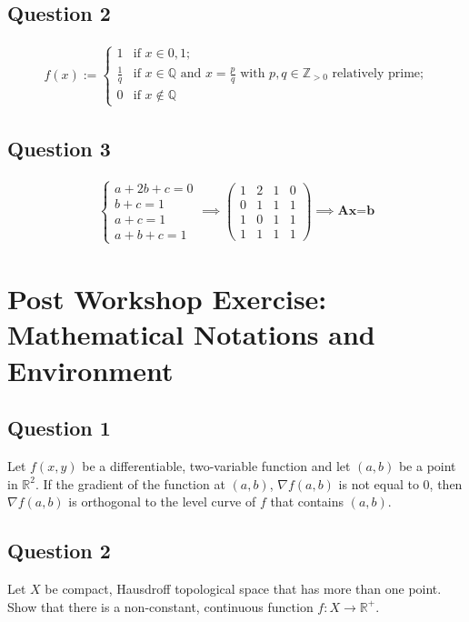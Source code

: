 \documentclass[12pt]{article}
\begin{document}
\subsection{Question 2}
\begin{align*}
    f(x):=
    \left\{
    \begin{array}{ll}
        1 & \text{if } x\in {0,1};\\
        \frac{1}{q} & \text{if } x\in\mathbb{Q} \text{ and } x=\frac{p}{q} \text{ with } p,q\in\mathbb{Z}_{>0} \text{ relatively prime;}\\
        0 & \text{if } x\notin\mathbb{Q}
    \end{array}
    \right.
\end{align*}
\subsection{Question 3}
\begin{align*}
    \left\{
    \begin{array}{l}
        a+2b+c=0\\
        b+c=1\\
        a+c=1\\
        a+b+c=1
    \end{array}
    \right.
    \implies
    \left(
    \begin{array}{ccc|c}
        1 & 2 & 1 & 0\\
        0 & 1 & 1 & 1\\
        1 & 0 & 1 & 1\\
        1 & 1 & 1 & 1
    \end{array}
    \right)
    \implies
    \textbf{Ax=b}
\end{align*}
\section{Post Workshop Exercise: Mathematical Notations and Environment}
\subsection{Question 1}
Let $f(x,y)$ be a differentiable, two-variable function and let $(a,b)$ be a point in $\mathbb{R}^2$. If the gradient of the function at $(a,b)$, $\nabla f(a,b)$ is not equal to $0$, then $\nabla f(a,b)$ is orthogonal to the level curve of $f$ that contains $(a,b)$.
\subsection{Question 2}
Let $X$ be compact, Hausdroff topological space that has more than one point. Show that there is a non-constant, continuous function $f:X\to \mathbb{R}^+$.
\end{document}
